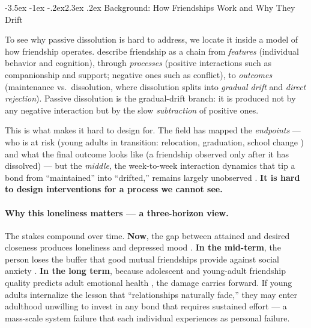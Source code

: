\documentclass[11pt]{article}
\makeatletter
\renewcommand\section{\@startsection{section}{1}{\z@}%
  {-3.5ex \@plus -1ex \@minus -.2ex}{2.3ex \@plus .2ex}%
  {\normalfont\Large\bfseries\color{accent}}}
\makeatother
\begin{document}
\section{Background: How Friendships Work and Why They Drift}

To see why passive dissolution is hard to address, we locate it inside a model of
how friendship operates. \citet{santucci2025} describe friendship as a chain from
\emph{features} (individual behavior and cognition), through \emph{processes}
(positive interactions such as companionship and support; negative ones such as
conflict), to \emph{outcomes} (maintenance vs.\ dissolution, where dissolution
splits into \emph{gradual drift} and \emph{direct rejection}). Passive
dissolution is the gradual-drift branch: it is produced not by any negative
interaction but by the slow \emph{subtraction} of positive ones.

This is what makes it hard to design for. The field has mapped the
\emph{endpoints} --- who is at risk (young adults in transition: relocation,
graduation, school change \citep{vieth2022, vernberg2006}) and what the final
outcome looks like (a friendship observed only after it has dissolved) --- but
the \emph{middle}, the week-to-week interaction dynamics that tip a bond from
``maintained'' into ``drifted,'' remains largely unobserved \citep{santucci2025}.
\textbf{It is hard to design interventions for a process we cannot see.}

\paragraph{Why this loneliness matters --- a three-horizon view.}
The stakes compound over time. \textbf{Now}, the gap between attained and desired
closeness produces loneliness and depressed mood \citep{grigoriadis2024}.
\textbf{In the mid-term}, the person loses the buffer that good mutual
friendships provide against social anxiety \citep{erath2010}. \textbf{In the
long term}, because adolescent and young-adult friendship quality predicts adult
emotional health \citep{allen2024}, the damage carries forward. If young adults
internalize the lesson that ``relationships naturally fade,'' they may enter
adulthood unwilling to invest in any bond that requires sustained effort --- a
mass-scale system failure that each individual experiences as personal failure.

\end{document}
